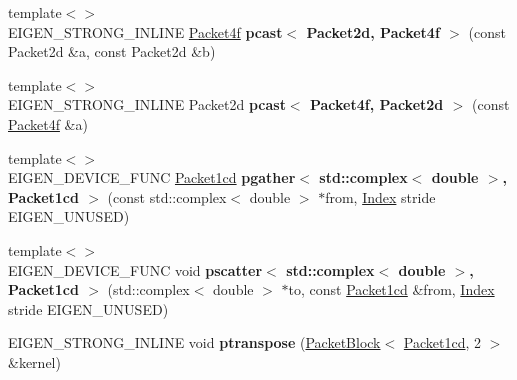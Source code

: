 \begin{DoxyCompactItemize}
{\footnotesize template$<$$>$ }\\E\+I\+G\+E\+N\+\_\+\+S\+T\+R\+O\+N\+G\+\_\+\+I\+N\+L\+I\+NE \hyperlink{struct_eigen_1_1internal_1_1_packet4f}{Packet4f} {\bfseries pcast$<$ Packet2d, Packet4f $>$} (const Packet2d \&a, const Packet2d \&b)
\item 
\mbox{\label{namespace_eigen_1_1internal_a4d363aa0f26d1590a08f81a0b079d42a}} 
{\footnotesize template$<$$>$ }\\E\+I\+G\+E\+N\+\_\+\+S\+T\+R\+O\+N\+G\+\_\+\+I\+N\+L\+I\+NE Packet2d {\bfseries pcast$<$ Packet4f, Packet2d $>$} (const \hyperlink{struct_eigen_1_1internal_1_1_packet4f}{Packet4f} \&a)
\item 
\mbox{\label{namespace_eigen_1_1internal_a27be9d816b0e77a8d22c2a3d67c57456}} 
{\footnotesize template$<$$>$ }\\E\+I\+G\+E\+N\+\_\+\+D\+E\+V\+I\+C\+E\+\_\+\+F\+U\+NC \hyperlink{struct_eigen_1_1internal_1_1_packet1cd}{Packet1cd} {\bfseries pgather$<$ std\+::complex$<$ double $>$, Packet1cd $>$} (const std\+::complex$<$ double $>$ $\ast$from, \hyperlink{namespace_eigen_a62e77e0933482dafde8fe197d9a2cfde}{Index} stride E\+I\+G\+E\+N\+\_\+\+U\+N\+U\+S\+ED)
\item 
\mbox{\label{namespace_eigen_1_1internal_afc41c0196b601e87b2123adfee80c65f}} 
{\footnotesize template$<$$>$ }\\E\+I\+G\+E\+N\+\_\+\+D\+E\+V\+I\+C\+E\+\_\+\+F\+U\+NC void {\bfseries pscatter$<$ std\+::complex$<$ double $>$, Packet1cd $>$} (std\+::complex$<$ double $>$ $\ast$to, const \hyperlink{struct_eigen_1_1internal_1_1_packet1cd}{Packet1cd} \&from, \hyperlink{namespace_eigen_a62e77e0933482dafde8fe197d9a2cfde}{Index} stride E\+I\+G\+E\+N\+\_\+\+U\+N\+U\+S\+ED)
\item 
\mbox{\label{namespace_eigen_1_1internal_a03c68a7844a6c488608dd1fdb91cedfb}} 
E\+I\+G\+E\+N\+\_\+\+S\+T\+R\+O\+N\+G\+\_\+\+I\+N\+L\+I\+NE void {\bfseries ptranspose} (\hyperlink{struct_eigen_1_1internal_1_1_packet_block}{Packet\+Block}$<$ \hyperlink{struct_eigen_1_1internal_1_1_packet1cd}{Packet1cd}, 2 $>$ \&kernel)
\item 
\mbox{\label{namespace_eigen_1_1internal_a40917da485e7ba10fa25cd122220a79e}} 

\end{DoxyCompactItemize}

